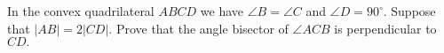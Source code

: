 In the convex quadrilateral $ABCD$ we have $\angle B = \angle C$ and $\angle D = 90^{\circ}.$ Suppose that $|AB| = 2|CD|.$ Prove that the angle bisector of $\angle ACB$ is perpendicular to $CD.$